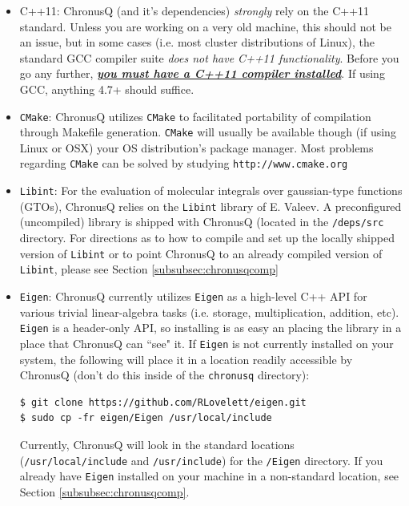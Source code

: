 \documentclass[12pt]{article}
\begin{document}
\begin{itemize}
\item C++11: ChronusQ (and it's dependencies) \emph{strongly} rely on the C++11 standard. Unless you are working on a very old machine, this should not be an issue, but in some cases (i.e. most cluster distributions of Linux), the standard GCC compiler suite \emph{does not have C++11 functionality}. Before you go any further, \emph{\textbf{\underline{you must have a C++11 compiler installed}}}. If using GCC, anything 4.7+ should suffice.

\item \texttt{CMake}: ChronusQ utilizes \texttt{CMake} to facilitated portability of compilation through Makefile generation. \texttt{CMake} will usually be available though (if using Linux or OSX) your OS distribution's package manager. Most problems regarding \texttt{CMake} can be solved by studying \texttt{http://www.cmake.org}

\item \texttt{Libint}: For the evaluation of molecular integrals over gaussian-type functions (GTOs), ChronusQ relies on the \texttt{Libint} library of E. Valeev. A preconfigured (uncompiled) library is shipped with ChronusQ (located in the \texttt{/deps/src} directory. For directions as to how to compile and set up the locally shipped version of \texttt{Libint} or to point ChronusQ to an already compiled version of \texttt{Libint}, please see Section \ref{subsubsec:chronusqcomp}

\item \texttt{Eigen}: ChronusQ currently utilizes \texttt{Eigen} as a high-level C++ API for various trivial linear-algebra tasks (i.e. storage, multiplication, addition, etc). \texttt{Eigen} is a header-only API, so installing is as easy an placing the library in a place that ChronusQ can ``see" it. If \texttt{Eigen} is not currently installed on your system, the following will place it in a location readily accessible by ChronusQ (don't do this inside of the \texttt{chronusq} directory):
\begin{lstlisting}
$ git clone https://github.com/RLovelett/eigen.git
$ sudo cp -fr eigen/Eigen /usr/local/include
\end{lstlisting}
Currently, ChronusQ will look in the standard locations (\texttt{/usr/local/include} and \texttt{/usr/include}) for the \texttt{/Eigen} directory. If you already have \texttt{Eigen} installed on your machine in a non-standard location, see Section \ref{subsubsec:chronusqcomp}.


\end{itemize}
\end{document}
